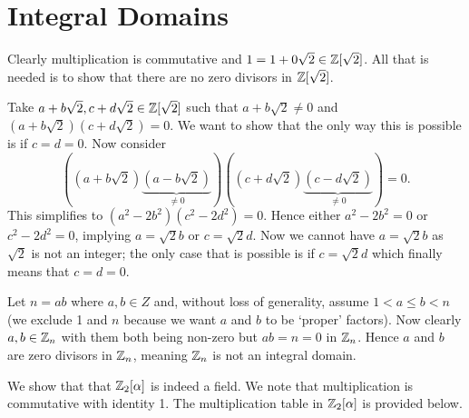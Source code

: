 \section{Integral Domains}
\begin{questions}
    \item Clearly multiplication is commutative and $1 = 1 + 0\sqrt2 \in \mathbb{Z}[\sqrt2]$. All that is needed is to show that there are no zero divisors in $\mathbb{Z}[\sqrt2]$.
    
    Take $a+b\sqrt2, c+d\sqrt2 \in \mathbb{Z}[\sqrt2]$ such that $a+b\sqrt2 \neq 0$ and $(a+b\sqrt2)(c+d\sqrt2) = 0$. We want to show that the only way this is possible is if $c = d = 0$. Now consider
    \[
        \left((a+b\sqrt2)\underbrace{(a-b\sqrt2)}_{\neq 0}\right)\left((c+d\sqrt2)\underbrace{(c-d\sqrt2)}_{\neq 0}\right) = 0.
    \]
    This simplifies to $(a^2-2b^2)(c^2-2d^2) = 0$. Hence either $a^2-2b^2 = 0$ or $c^2-2d^2 = 0$, implying $a = \sqrt2b$ or $c = \sqrt2d$. Now we cannot have $a = \sqrt2b$ as $\sqrt2$ is not an integer; the only case that is possible is if $c = \sqrt2d$ which finally means that $c = d = 0$.

    \item Let $n = ab$ where $a,b \in Z$ and, without loss of generality, assume $1 < a \leq b < n$ (we exclude 1 and $n$ because we want $a$ and $b$ to be `proper' factors). Now clearly $a, b \in \mathbb{Z}_n$ with them both being non-zero but $ab = n = 0$ in $\mathbb{Z}_n$. Hence $a$ and $b$ are zero divisors in $\mathbb{Z}_n$, meaning $\mathbb{Z}_n$ is not an integral domain.
    
    \item We show that that $\mathbb{Z}_2[\alpha]$ is indeed a field. We note that multiplication is commutative with identity 1. The multiplication table in $\mathbb{Z}_2[\alpha]$ is provided below.
    \begin{table}[h]
        \centering
    \end{table}


\end{questions}
